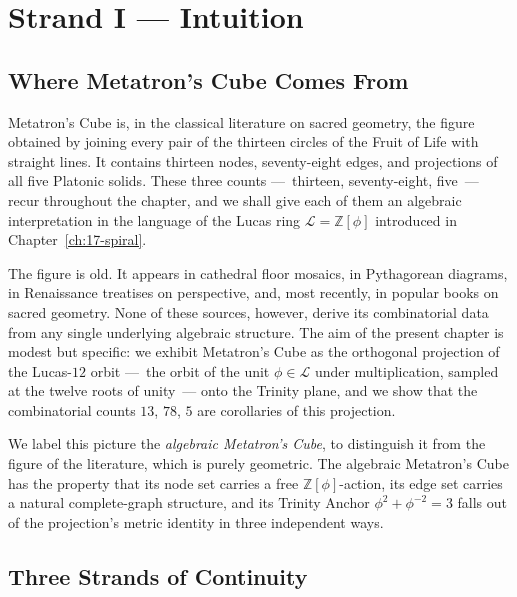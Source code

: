 
\section{Strand I --- Intuition}
\label{fa_13:sec:13-strand-I}

\subsection{Where Metatron's Cube Comes From}
\label{fa_13:sec:13-origin}

Metatron's Cube is, in the classical literature on sacred geometry,
the figure obtained by joining every pair of the thirteen circles of
the Fruit of Life with straight lines. It contains thirteen nodes,
seventy-eight edges, and projections of all five Platonic solids.
These three counts ---~thirteen, seventy-eight, five~--- recur
throughout the chapter, and we shall give each of them an algebraic
interpretation in the language of the Lucas ring
$\mathcal{L} = \mathbb{Z}[\phi]$ introduced in
Chapter~\ref{ch:17-spiral}.

The figure is old. It appears in cathedral floor mosaics, in
Pythagorean diagrams, in Renaissance treatises on perspective, and,
most recently, in popular books on sacred geometry. None of these
sources, however, derive its combinatorial data from any single
underlying algebraic structure. The aim of the present chapter is
modest but specific: we exhibit Metatron's Cube as the orthogonal
projection of the Lucas-$12$ orbit ---~the orbit of the unit
$\phi \in \mathcal{L}$ under multiplication, sampled at the twelve
roots of unity~--- onto the Trinity plane, and we show that the
combinatorial counts $13$, $78$, $5$ are corollaries of this
projection.

We label this picture the \emph{algebraic Metatron's Cube}, to
distinguish it from the figure of the literature, which is purely
geometric. The algebraic Metatron's Cube has the property that its
node set carries a free $\mathbb{Z}[\phi]$-action, its edge set
carries a natural complete-graph structure, and its Trinity Anchor
$\phi^{2} + \phi^{-2} = 3$ falls out of the projection's metric
identity in three independent ways.

\subsection{Three Strands of Continuity}
\label{fa_13:sec:13-three-strands}

